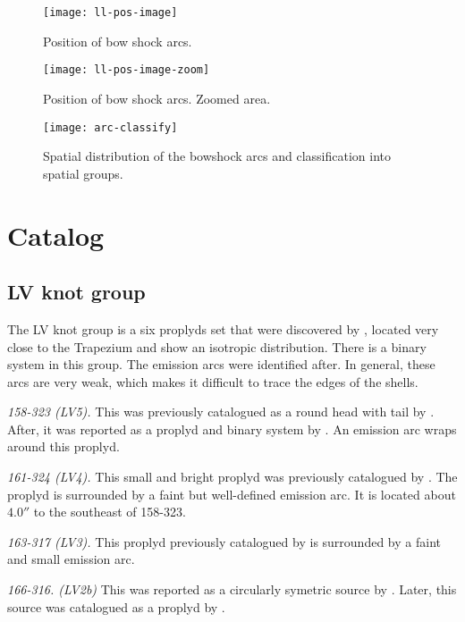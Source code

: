 \documentclass[iop, apj]{emulateapj}
\begin{document}
\begin{figure*}
  \texttt{[image: ll-pos-image]}
  \caption{Position of bow shock arcs.}
  \label{fig:pos-image}
\end{figure*}

\begin{figure*}
  \texttt{[image: ll-pos-image-zoom]}
  \caption{Position of bow shock arcs. Zoomed area.}
  \label{fig:pos-image}
\end{figure*}

\begin{figure*}
  \centering
  \texttt{[image: arc-classify]}
  \caption{Spatial distribution of the bowshock arcs and classification into spatial groups.}
  \label{fig:size-v-distance}
\end{figure*}

\section{Catalog}
\label{sec:catalog}

\subsection{LV knot group}
\label{sec:lv-group}



The LV knot group is a six proplyds set that were discovered by \citet{Laques:1979a}, located very close to the Trapezium and show an isotropic distribution. There is a binary system in this group. The emission arcs were identified after. In general, these arcs are very weak, which makes it difficult to trace the edges of the shells.

\textit{158-323 (LV5).} This was previously catalogued as a round head with tail by \citet{ODell:1996a}. After, it was reported as a proplyd and binary system by \citep{Ricci:2008a}. An emission arc wraps around this proplyd. 
 
\textit{161-324 (LV4).} This small and bright proplyd was previously catalogued by \citet{ODell:1996a, Ricci:2008a}. The proplyd is surrounded by a faint but well-defined emission arc. It is located about \(4.0''\) to the southeast of 158-323.

\textit{163-317 (LV3).} This proplyd previously catalogued by \citet{ODell:1996a, Ricci:2008a} is surrounded by a faint and small emission arc. 

\textit{166-316. (LV2b)} This was reported as a circularly symetric source by \citet{ODell:1996a}. Later, this source was catalogued as a proplyd by \citet{Ricci:2008a}. 
\end{document}
